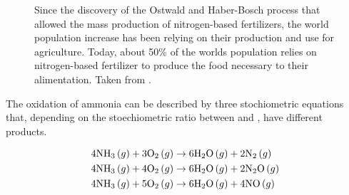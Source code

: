 \begin{figure}
\centering
    \caption{
    Since the discovery of the Ostwald and Haber-Bosch process that allowed the mass production of nitrogen-based fertilizers, the world population increase has been relying on their production and use for agriculture.
    Today, about 50\% of the worlds population relies on nitrogen-based fertilizer to produce the food necessary to their alimentation.
    Taken from \cite{WorldDataFertilizer}.
    }
    \label{fig:FertilizerWID}
\end{figure}

The oxidation of ammonia can be described by three stochiometric equations that, depending on the stoechiometric ratio between \ammonia and \dioxygen, have different products.

\begin{align}
    \label{eq:AmmoniaOxidationNitrogen}
    4 \ammonia (g) + 3 \dioxygen (g) & \rightarrow 6 \water (g) + 2 \nitrogen (g) \\
    \label{eq:AmmoniaOxidationNitrousOxide}
    4 \ammonia (g) + 4 \dioxygen (g) & \rightarrow 6 \water (g) + 2 \nitrousoxide (g) \\
    \label{eq:AmmoniaOxidationNitricOxide}
    4 \ammonia (g) + 5 \dioxygen (g) & \rightarrow 6 \water (g) + 4 \nitricoxide (g)
\end{align}

